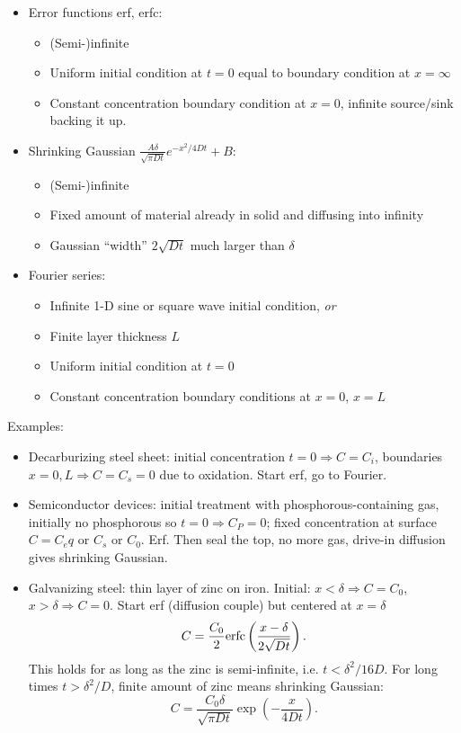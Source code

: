\documentclass{report}
\begin{document}
\begin{itemize}
\item Error functions erf, erfc:
  \begin{itemize}
  \item (Semi-)infinite
  \item Uniform initial condition at $t=0$ equal to boundary condition at
    $x=\infty$
  \item Constant concentration boundary condition at $x=0$, infinite
    source/sink backing it up.
  \end{itemize}

\item Shrinking Gaussian $\frac{A\delta}{\sqrt{\pi Dt}}e^{-x^2/4Dt} + B$:
  \begin{itemize}
  \item (Semi-)infinite
  \item Fixed amount of material already in solid and diffusing into infinity
  \item Gaussian ``width'' $2\sqrt{Dt}$ much larger than $\delta$
  \end{itemize}

\item Fourier series:
  \begin{itemize}
  \item Infinite 1-D sine or square wave initial condition, {\em or}
  \item Finite layer thickness $L$
  \item Uniform initial condition at $t=0$
  \item Constant concentration boundary conditions at $x=0$, $x=L$
  \end{itemize}
\end{itemize}

\noindent Examples:
\begin{itemize}
\item Decarburizing steel sheet: initial concentration $t=0\Rightarrow C=C_i$,
  boundaries $x=0,L\Rightarrow C=C_s=0$ due to oxidation.  Start erf, go to
  Fourier.
\item Semiconductor devices: initial treatment with phosphorous-containing gas,
  initially no phosphorous so $t=0\Rightarrow C_P=0$; fixed concentration at
  surface $C=C_eq$ or $C_s$ or $C_0$.  Erf.  Then seal the top, no more gas,
  drive-in diffusion gives shrinking Gaussian.
\item Galvanizing steel: thin layer of zinc on iron.  Initial:
  $x<\delta\Rightarrow C=C_0$, $x>\delta\Rightarrow C=0$.  Start erf (diffusion
  couple) but centered at $x=\delta$
  \begin{equation}
    \label{eq:galvcouple}
    C=\frac{C_0}{2}{\rm erfc}\left(\frac{x-\delta}{2\sqrt{Dt}}\right).
  \end{equation}
  This holds for as long as the zinc is semi-infinite, i.e. $t<\delta^2/16D$.
  For long times $t>\delta^2/D$, finite amount of zinc means shrinking
  Gaussian:
  \begin{equation}
    \label{eq:galvgauss}
    C=\frac{C_0\delta}{\sqrt{\pi Dt}} \exp\left(-\frac{x}{4Dt}\right).
  \end{equation}
\end{itemize}
\newpage
\end{document}
